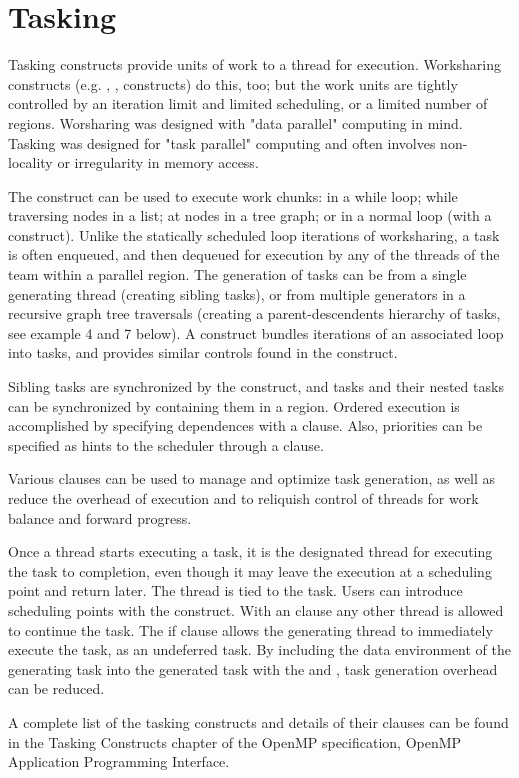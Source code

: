 \pagebreak
\chapter{Tasking}
\label{chap:tasking}

Tasking constructs provide units of work to a thread for execution.  
Worksharing constructs (e.g. , ,  constructs) do this, too; 
but the work units are tightly controlled by an iteration limit and limited 
scheduling, or a limited number of  regions. Worsharing was designed 
with "data parallel" computing in mind.  Tasking was designed for 
"task parallel" computing and often involves non-locality or irregularity 
in memory access.

The  construct can be used to execute work chunks: in a while loop; 
while traversing nodes in a list; at nodes in a tree graph; 
or in a normal loop (with a  construct).  
Unlike the statically scheduled loop iterations of worksharing, a task is 
often enqueued, and then dequeued for execution by any of the threads of the
team within a parallel region. The generation of tasks can be from a single 
generating thread (creating sibling tasks), or from multiple generators
in a recursive graph tree traversals (creating a parent-descendents
hierarchy of tasks, see example 4 and 7  below). A  construct
bundles iterations of an associated loop into tasks, and provides 
similar controls found in the  construct.

Sibling tasks are synchronized by the  construct, and tasks
and their nested tasks can be synchronized by containing them in
a  region.  Ordered execution is accomplished by specifying
dependences with a  clause. Also, priorities can be
specified as hints to the scheduler through a  clause.

Various clauses can be used to manage and optimize task generation,
as well as reduce the overhead of execution and to reliquish 
control of threads for work balance and forward progress. 

Once a thread starts executing a task, it is the designated thread 
for executing the task to completion, even though it may leave the
execution at a scheduling point and return later.  The thread is tied
to the task.  Users can introduce scheduling points with the 
construct.  With an  clause any other thread is allowed to continue
the task.  The if clause allows the generating thread to immediately
execute the task, as an undeferred task.  By including the data 
environment of the generating task into the generated task with the 
 and , task generation overhead can be reduced.

A complete list of the tasking constructs and details of their clauses
can be found in the Tasking Constructs chapter of the OpenMP specification,
OpenMP Application Programming Interface.

